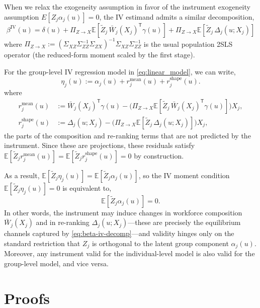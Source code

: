 \documentclass[12pt]{article}
\newcommand{\E}{\mathbb{E}}
\newcommand{\T}{\mathsf{T}} %
\begin{document}
When we relax the exogeneity assumption in favor of the instrument exogeneity assumption $E\left[Z_j \alpha_j(u)\right]=0$, the IV estimand admits a similar decomposition,
\begin{equation}\label{eq:beta-iv-decomp}
\beta^{\mathrm{IV}}(u)
=
\delta(u)
+
\Pi_{Z\to X}\E\!\left[\tilde Z_j\,\bar W_j(X_j)^{\T}\gamma(u)\right]
+
\Pi_{Z\to X}\E\!\left[\tilde Z_j\,\Delta_j(u;X_j)\right]
\end{equation}
where $\Pi_{Z\to X}:=(\Sigma_{XZ}\Sigma_{ZZ}^{-1}\Sigma_{ZX})^{-1}\Sigma_{XZ}\Sigma_{ZZ}^{-1}$ is the usual population 2SLS operator (the reduced-form moment scaled by the first stage).

For the group-level IV regression model in \eqref{eq:linear_model}, we can write,
\begin{equation}\label{eq:eta_def}
\eta_j(u):=\alpha_j(u)+r^{\text{mean}}_j(u)+r^{\text{shape}}_j(u).
\end{equation}
where
\begin{align}
r^{\text{mean}}_j(u)
&:=
\bar W_j(X_j)^{\T}\gamma(u)
-
\Big(\Pi_{Z\to X}\E[\tilde Z_j\,\bar W_j(X_j)^{\T}\gamma(u)]\Big)X_j,
\label{eq:r_mean_def}
\\
r^{\text{shape}}_j(u)
&:=
\Delta_j(u;X_j)
-
\Big(\Pi_{Z\to X}\E[\tilde Z_j\,\Delta_j(u;X_j)]\Big)X_j,
\label{eq:r_shape_def}
\end{align}
the parts of the composition and re-ranking terms that are not predicted by the instrument.
Since these are projections, these residuals satisfy
$\E[\tilde Z_j r^{\text{mean}}_j(u)]=\E[\tilde Z_j r^{\text{shape}}_j(u)]=0$ by construction.

As a result, $\E[\tilde Z_j\eta_j(u)]=\E[\tilde Z_j\alpha_j(u)]$, so the IV moment condition
$\E[\tilde Z_j\eta_j(u)]=0$ is equivalent to,
\begin{equation}\label{eq:iv_exogeneity_alpha}
\E[\tilde Z_j\alpha_j(u)]=0.
\end{equation}
In other words, the instrument may induce changes in workforce composition $\bar W_j(X_j)$ and in re-ranking $\Delta_j(u;X_j)$---these are precisely the equilibrium channels captured by \eqref{eq:beta-iv-decomp}---and validity hinges only on the standard restriction that $Z_j$ is orthogonal to the latent group component $\alpha_j(u)$. Moreover, any instrument valid for the individual-level model is also valid for the group-level model, and vice versa.


\section{Proofs}\label{sec:proofs_appendix}
\end{document}

